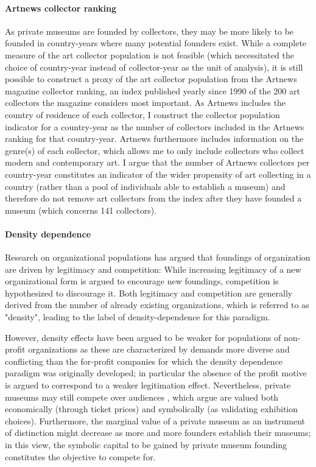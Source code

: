 \documentclass[11pt]{article}
\begin{document}
\paragraph*{Artnews collector ranking}

As private museums are founded by collectors, they may be more likely to be founded in country-years where many potential founders exist.
While a complete measure of the art collector population is not feasible (which necessitated the choice of country-year instead of collector-year as the unit of analysis), it is still possible to construct a proxy of the art collector population from the Artnews magazine collector ranking, an index published yearly since 1990 of the 200 art collectors the magazine considers most important.
As Artnews includes the country of residence of each collector, I construct the collector population indicator for a country-year as the number of collectors included in the Artnews ranking for that country-year.
Artnews furthermore includes information on the genre(s) of each collector, which allows me to only include collectors who collect modern and contemporary art.
I argue that the number of Artnews collectors per country-year constitutes an indicator of the wider propensity of art collecting in a country (rather than a pool of individuals able to establish a museum) and therefore do not remove art collectors from the index after they have founded a museum (which concerns 141 collectors).



\paragraph*{Density dependence}

Research on organizational populations \parencite{Carroll_1989_density,Hannan_1992_dynamics} has argued that foundings of organization are driven by legitimacy and competition:
While increasing legitimacy of a new organizational form is argued to encourage new foundings, competition is hypothesized to discourage it.
Both legitimacy and competition are generally derived from the number of already existing organizations, which is referred to as "density", leading to the label of density-dependence for this paradigm. 


However, density effects have been argued to be weaker for populations of non-profit organizations \parencite{Bogaert_etal_2014_ecological} as these are characterized by demands more diverse and conflicting than the for-profit companies for which the density dependence paradigm was originally developed; in particular the absence of the profit motive is argued to correspond to a weaker legitimation effect. 
Nevertheless, private museums may still compete over audiences \parencite[p.14]{Adam_2021_rise}, which \textcite{Frey_Meier_2002_beyeler} argue are valued both economically (through ticket prices) and symbolically (as validating exhibition choices).
Furthermore, the marginal value of a private museum as an instrument of distinction might decrease as more and more founders establish their museums; in this view, the symbolic capital to be gained by private museum founding constitutes the objective to compete for. 
\end{document}
